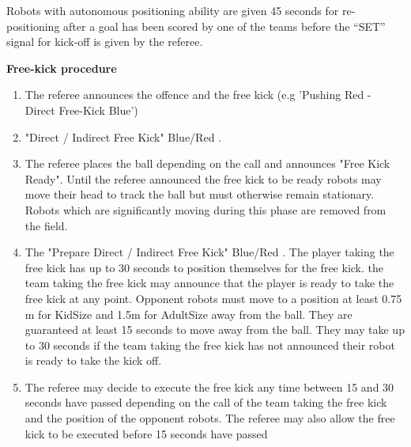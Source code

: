Robots with autonomous positioning ability are given  45 seconds
for re-positioning after a goal has been scored by one of the teams before the
``SET'' signal for kick-off is given by the referee. 

\bigskip


{\bfseries Free-kick procedure}

\begin{enumerate}
\item The referee  announces the offence and the free kick
      (e.g 'Pushing Red - Direct Free-Kick Blue')
\item {}  "Direct / Indirect Free Kick" Blue/Red .
\item The referee places the ball depending on the call and announces "Free Kick Ready".
      Until the referee announced the free kick to be ready robots may move
      their head to track the ball but must otherwise remain stationary.
      Robots which are significantly moving during this phase are removed from the field.
\item The  
      "Prepare Direct / Indirect Free Kick" Blue/Red .
      The player taking the free kick has up to 30 seconds to position
      themselves for the free kick.
       the team taking the free kick may announce that the player is ready to
      take the free kick at any point.
      Opponent robots must move to a position at least 0.75 m for KidSize and
      1.5m for AdultSize away from the ball.
      They are guaranteed at least 15 seconds to move away from the ball.
      They may take up to 30 seconds if the team taking the free kick has not
      announced their robot is ready to take the kick off.
\item The referee may decide to execute the free kick any time between 15 and 30 seconds
      have passed depending on the call of the team taking the free kick and the position of
      the opponent robots.
      The referee may also allow the free kick to be executed before 15 seconds have passed

\end{enumerate}
